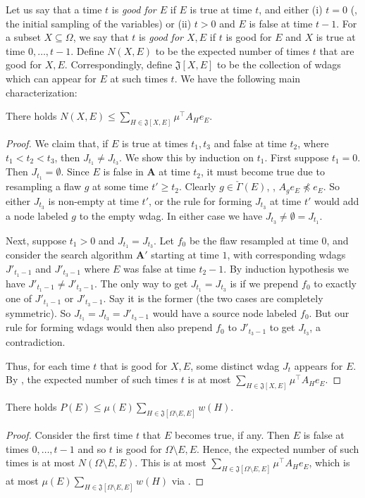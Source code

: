 \documentclass{toc}
\begin{document}
Let us say that a time $t$ is \emph{good for $E$} if $E$ is true at time $t$, and either (i) $t = 0$ (\ie, the initial sampling of the variables) or (ii) $t > 0$ and $E$ is false at time $t-1$.   For a subset $X \subseteq \Omega$, we say that $t$ is \emph{good for $X,E$} if $t$ is good for $E$ and $X$ is true at time $0, \dots, t-1$.  Define $N(X,E)$ to be the expected number of times $t$ that are good for $X,E$. Correspondingly, define $\mathfrak J[X,E]$ to be the collection of wdags which can appear for $E$ at such times $t$. We have the following main characterization:
\begin{proposition}
\label{N-prop}
There holds $N(X, E) \leq \sum_{H \in \mathfrak J[X,E]} \mu^{\top} A_H e_E$.
\end{proposition}
\begin{proof}
We claim that, if $E$ is true at times $t_1, t_3$ and false at time $t_2$, where $t_1 < t_2 < t_3$, then $J_{t_1} \neq J_{t_3}$.  We show this by induction on $t_1$. First suppose $t_1 = 0$.  Then $J_{t_1} = \emptyset$.  Since $E$ is false in $\mathbf A$ at time $t_2$, it must become true due to resampling a flaw $g$ at some time $t' \geq t_2 $. Clearly $g \in \check \Gamma(E)$, \ie, $A_g e_E \not \preceq e_E$. So either $J_{t_3}$ is non-empty at time $t'$, or the rule for forming $J_{t_3 }$ at time $t'$ would add a node labeled $g$ to the empty wdag. In either case we have $J_{t_3} \neq \emptyset = J_{t_1}$.

Next, suppose $t_1 > 0$ and $J_{t_1} = J_{t_3}$. Let $f_0$ be the flaw resampled at time $0$, and consider the search algorithm $\mathbf A'$ starting at time $1$, with corresponding wdags $J'_{t_1-1}$ and $J'_{t_3-1}$ where $E$ was false at time $t_2-1$. By induction hypothesis we have $J'_{t_1 - 1} \neq J'_{t_3 - 1}$. The only way to get $J_{t_1} = J_{t_3}$ is if we prepend $f_0$ to exactly one of $J'_{t_1-1}$ or $J'_{t_3-1}$. Say it is the former (the two cases are completely symmetric). So $J_{t_1} = J_{t_3} = J'_{t_3-1}$ would have a source node labeled $f_0$. But our rule for forming wdags would then also prepend $f_0$ to $J'_{t_3-1}$ to get $J_{t_3}$, a contradiction. 

Thus, for each time $t$ that is good for $X,E$, some distinct wdag $J_t$ appears for $E$. By , the expected number of such times $t$ is at most $ \sum_{H \in \mathfrak J[X,E]}   \mu^{\top} A_H e_E$.
\end{proof}

\begin{corollary}
\label{distthm1d}
There holds $P(E) \leq \mu(E) \sum_{H \in \mathfrak J[ \Omega \setminus E, E]} w(H)$.
\end{corollary}
\begin{proof}
Consider the first time $t$ that $E$ becomes true, if any.  Then $E$ is false at times $0, \dots, t-1$ and so $t$ is good for $\Omega \setminus E, E$. Hence, the expected number of such times is at most $N(\Omega \setminus E, E)$. This is at most $\sum_{H \in \mathfrak J[ \Omega \setminus E, E]} \mu^{\top} A_H e_E$, which is at most $\mu(E) \sum_{H \in \mathfrak J[ \Omega \setminus E, E]} w(H)$ via .
\end{proof}
\end{document}
